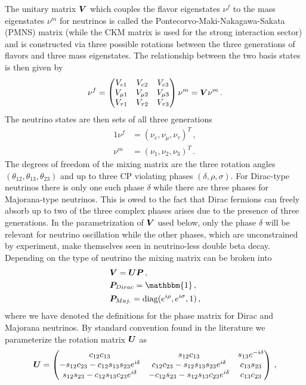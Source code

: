 The unitary matrix $\boldsymbol{V}$ which couples the flavor eigenstates $\nu^{f}$ to the mass eigenstates $\nu^{m}$ for neutrinos is called the Pontecorvo-Maki-Nakagawa-Sakata (PMNS) matrix (while the CKM matrix is used for the strong interaction sector) and is constructed via three possible rotations between the three generations of flavors and three mass eigenstates. The relationship between the two basis states is then given by
\begin{alignat}{1}
	\label{pmns:eq:01} \nu^{f} = 
	\begin{pmatrix}
		V_{e1} & V_{e2} & V_{e3}\\
		V_{\mu1} & V_{\mu2} & V_{\mu3}\\
		V_{\tau1} & V_{\tau2} & V_{\tau3}
	\end{pmatrix}
	\nu^{m} = \boldsymbol{V}\nu^{m}\,.
\end{alignat}
The neutrino states are then sets of all three generations
\begin{alignat}{1}
	\label{pmns:eq:01a}\nu^{f} &= (\nu_{e},\nu_{\mu},\nu_{\tau})^{T}\,,\\
	\label{pmns:eq:01b}\nu^{m} &= (\nu_{1},\nu_{2},\nu_{3})^{T}\,.
\end{alignat}
The degrees of freedom of the mixing matrix are the three rotation angles $(\theta_{12}, \theta_{13}, \theta_{23})$ and up to three CP violating phases $(\delta, \rho, \sigma)$. For Dirac-type neutrinos there is only one such phase $\delta$ while there are three phases for Majorana-type neutrinos. This is owed to the fact that Dirac fermions can freely absorb up to two of the three complex phases arises due to the presence of three generations. In the parametrization of $\boldsymbol{V}$ used below, only the phase $\delta$ will be relevant for neutrino oscillation while the other phases, which are unconstrained by experiment, make themselves seen in neutrino-less double beta decay. Depending on the type of neutrino the mixing matrix can be broken into
\begin{alignat}{1}
	\label{pmns:eq:02a} &\bb{V} = \bb{U}\bb{P}\,,\\
	\label{pmns:eq:02b} &\bb{P}_{Dirac} = \mathbbm{1}\,,\\
	\label{pmns:eq:02c} &\bb{P}_{Maj.} = \mathrm{diag}(e^{i\rho},e^{i\sigma},1)\,,
\end{alignat}
where we have denoted the definitions for the phase matrix for Dirac and Majorana neutrinos. By standard convention found in the literature we parameterize the rotation matrix $\boldsymbol{U}$ as
	\begin{alignat}{1}
  	\label{pmns:eq:03} \boldsymbol{U} =
		\begin{pmatrix}
			c_{12}c_{13} & s_{12}c_{13} & s_{13}e^{-i\delta}\\
			-s_{12}c_{23} - c_{12}s_{13}s_{23}e^{i\delta} & c_{12}c_{23} - s_{12}s_{13}s_{23}e^{i\delta} & c_{13}s_{23}\\
			s_{12}s_{23} - c_{12}s_{13}c_{23}e^{i\delta}& -c_{12}s_{23} - s_{12}s_{13}c_{23}e^{i\delta} & c_{13}c_{23}
		\end{pmatrix}\,,
	\end{alignat}
